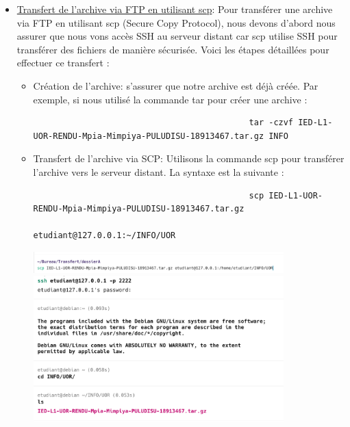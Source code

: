 \documentclass[a4paper,11pt]{article}
\begin{document}
\begin{enumerate}
\begin{itemize}
                        \item \underline{Transfert de l'archive via FTP en utilisant scp}:
                            \noindent Pour transférer une archive via FTP en utilisant scp (Secure Copy Protocol), nous devons 
                            d'abord nous assurer que nous vons accès SSH au serveur distant car scp utilise SSH pour transférer des fichiers de manière sécurisée. 
                            Voici les étapes détaillées pour effectuer ce transfert :
                            \begin{itemize}
                                \item Création de l'archive: s'assurer que notre archive est déjà créée. Par exemple, si nous utilisé la commande tar pour créer une archive :
                                    \begin{tcolorbox}[colback=lightgray!6, colframe=black, left=-85mm, right=5mm, top=2mm, bottom=-2mm, boxrule=0.1mm]
                                        \begin{verbatim}
                                            tar -czvf IED-L1-UOR-RENDU-Mpia-Mimpiya-PULUDISU-18913467.tar.gz INFO
                                        \end{verbatim}
                                    \end{tcolorbox}
                                \item Transfert de l'archive via SCP: Utilisons la commande scp pour transférer l'archive vers le serveur distant. La syntaxe est la suivante :
                                    \begin{tcolorbox}[colback=lightgray!6, colframe=black, left=-80mm, right=5mm, top=2mm, bottom=-2mm, boxrule=0.1mm]
                                        \begin{verbatim}
                                            scp IED-L1-UOR-RENDU-Mpia-Mimpiya-PULUDISU-18913467.tar.gz 
                                            etudiant@127.0.0.1:~/INFO/UOR
                                        \end{verbatim}
                                    \end{tcolorbox}
                                    \includegraphics[width=0.8\textwidth]{CHAPITRE-7/7.1-A-RENDRE/screenshots/screen6.png}\\
                                    \includegraphics[width=0.8\textwidth]{CHAPITRE-7/7.1-A-RENDRE/screenshots/screen5.png}

\end{itemize}
\end{itemize}
\end{enumerate}
\end{document}
